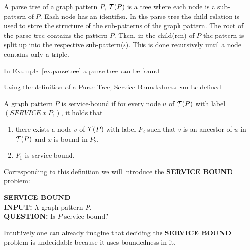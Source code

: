 \begin{definition}
	A parse tree of a graph pattern $P$, $\mathcal{T}(P)$ is a tree where each
	node is a sub-pattern of $P$. Each node has an identifier.
	In the parse tree the child relation is used to store the structure of the
	sub-patterns of the graph pattern. The root of the parse tree contains the pattern $P$. Then, 
	in the child(ren) of $P$ the pattern is split up into the respective sub-pattern(s). This is done recursively 	until a node contains only a triple. 
	
	
\end{definition}
In Example~\ref{ex:parsetree} a parse tree can be found


Using the definition of a Parse Tree, Service-Boundedness can be defined.

\begin{definition}
	A graph pattern $P$ is service-bound if for every node $u$ of $\mathcal{T}(P)$ with
	label $(SERVICE \ x\  P_1)$, it holds that
	\begin{enumerate}
		\item there exists a node $v$ of $\mathcal{T}(P)$ with label $P_2$ such that $v$
			is an ancestor of $u$ in $\mathcal{T}(P)$ and $x$ is bound in $P_2$,
		\item $P_1$ is service-bound.
	\end{enumerate}
\end{definition}

Corresponding to this definition we will introduce the \textbf{SERVICE BOUND}
problem:
\begin{framed}\noindent \textbf{SERVICE BOUND}\\
	\textbf{INPUT:} A graph pattern $P$.\\
	\textbf{QUESTION:} Is $P$ service-bound?
\end{framed}

Intuitively one can already imagine that deciding the \textbf{SERVICE BOUND}
problem is undecidable because it uses boundedness in it.

